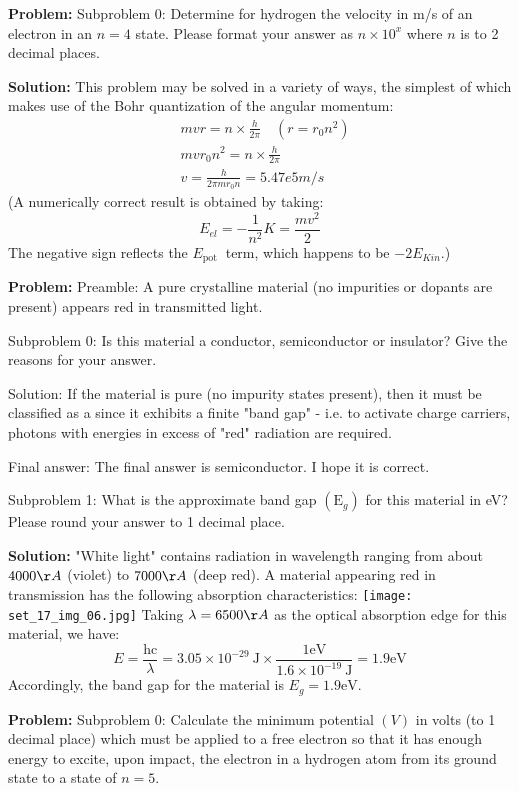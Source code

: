 \documentclass[10pt]{article}
\begin{document}
\textbf{Problem:}
Subproblem 0: Determine for hydrogen the velocity in m/s of an electron in an ${n}=4$ state. Please format your answer as $n \times 10^x$ where $n$ is to 2 decimal places. 


\textbf{Solution:}
This problem may be solved in a variety of ways, the simplest of which makes use of the Bohr quantization of the angular momentum:
\[
\begin{aligned}
&m v r=n \times \frac{h}{2 \pi} \quad\left(r=r_{0} n^{2}\right) \\
&m v r_{0} n^{2}=n \times \frac{h}{2 \pi} \\
&v=\frac{h}{2 \pi m r_{0} n}= \boxed{5.47e5} m/s
\end{aligned}
\]
(A numerically correct result is obtained by taking:
\[
E_{e l}=-\frac{1}{n^{2}} K=\frac{m v^{2}}{2}
\]
The negative sign reflects the $E_{\text {pot }}$ term, which happens to be $-2 E_{K i n}$.)


\textbf{Problem:}
Preamble: A pure crystalline material (no impurities or dopants are present) appears red in transmitted light.

Subproblem 0: Is this material a conductor, semiconductor or insulator? Give the reasons for your answer.


Solution: If the material is pure (no impurity states present), then it must be classified as a  since it exhibits a finite "band gap" - i.e. to activate charge carriers, photons with energies in excess of "red" radiation are required.

Final answer: The final answer is semiconductor. I hope it is correct.

Subproblem 1: What is the approximate band gap $\left(\mathrm{E}_{g}\right)$ for this material in eV? Please round your answer to 1 decimal place.


\textbf{Solution:}
"White light" contains radiation in wavelength ranging from about $4000 \AA$ (violet) to $7000 \AA$ (deep red). A material appearing red in transmission has the following absorption characteristics:
\texttt{[image: set\_17\_img\_06.jpg]}
\nonessentialimage
Taking $\lambda=6500 \AA$ as the optical absorption edge for this material, we have:
\[
E=\frac{\mathrm{hc}}{\lambda}=3.05 \times 10^{-29} \mathrm{~J} \times \frac{1 \mathrm{eV}}{1.6 \times 10^{-19} \mathrm{~J}}=1.9 \mathrm{eV}
\]
Accordingly, the band gap for the material is $E_{g}= \boxed{1.9} \mathrm{eV}$.


\textbf{Problem:}
Subproblem 0: Calculate the minimum potential $(V)$ in volts (to 1 decimal place) which must be applied to a free electron so that it has enough energy to excite, upon impact, the electron in a hydrogen atom from its ground state to a state of $n=5$.
\end{document}
